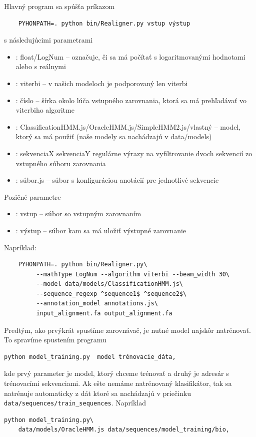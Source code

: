 Hlavný program sa spúšťa príkazom
\begin{verbatim}
    PYHONPATH=. python bin/Realigner.py vstup výstup
\end{verbatim}
s následujúcimi parametrami
\begin{itemize}
    \item {}: float/LogNum -- označuje, či sa má počítať s logaritmovanými hodnotami alebo s reálnymi
    \item {}: viterbi -- v našich modeloch je podporovaný len viterbi
    \item {}: číslo -- šírka okolo lúča vstupného zarovnania, ktorá sa má prehľadávať vo viterbiho algoritme
    \item {}: ClassificationHMM.js/OracleHMM.js/SimpleHMM2.js/vlastný -- model, ktorý sa má použiť (naše modely sa nachádzajú v data/models)
    \item {}: sekvenciaX sekvenciaY regulárne výrazy na vyfiltrovanie dvoch sekvencií zo vstupného súboru zarovnania
    \item {}: súbor.js -- súbor s konfiguráciou anotácií pre jednotlivé sekvencie
\end{itemize}
Pozičné parametre
\begin{itemize}
    \item {}: vstup -- súbor so vstupným zarovnaním
    \item {}: výstup -- súbor kam sa má uložiť výstupné zarovnanie
\end{itemize}
Napríklad:
\begin{verbatim}
    PYHONPATH=. python bin/Realigner.py\
         --mathType LogNum --algorithm viterbi --beam_width 30\
         --model data/models/ClassificationHMM.js\
         --sequence_regexp ^sequence1$ ^sequence2$\
         --annotation_model annotations.js\
         input_alignment.fa output_alignment.fa
\end{verbatim}

Predtým, ako prvýkrát spustíme zarovnávač, je nutné model najskôr natrénovať. To spravíme spustením programu
\begin{verbatim}
python model_training.py  model trénovacie_dáta,
\end{verbatim}
kde prvý parameter je model, ktorý chceme trénovať a druhý je adresár s trénovacími sekvenciami. Ak ešte nemáme natrénovaný klasifikátor, tak sa natrénuje automaticky z dát ktoré sa nachádzajú v priečinku {\tt data/sequences/train\_sequences}. Napríklad
\begin{verbatim}
python model_training.py\
    data/models/OracleHMM.js data/sequences/model_training/bio,
\end{verbatim}

